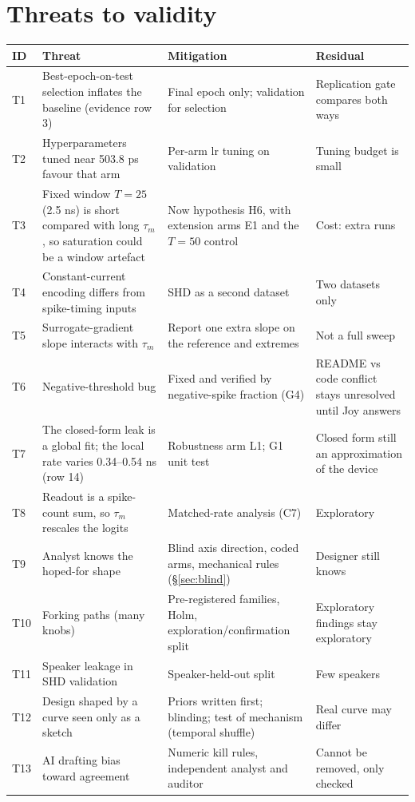 \documentclass[10pt,a4paper]{article}
\newcommand{\taum}{\tau_m}
\begin{document}
\section{Threats to validity}
{\footnotesize
\begin{longtable}{@{}p{0.8cm}L{4.4cm}L{6.0cm}L{3.0cm}@{}}
\toprule ID & Threat & Mitigation & Residual\\ \midrule\endhead
T1 & Best-epoch-on-test selection inflates the baseline (evidence row 3) & Final epoch only; validation for selection & Replication gate compares both ways\\
T2 & Hyperparameters tuned near 503.8 ps favour that arm & Per-arm lr tuning on validation & Tuning budget is small\\
T3 & Fixed window $T=25$ (2.5 ns) is short compared with long $\taum$, so saturation could be a window artefact & Now hypothesis H6, with extension arms E1 and the $T=50$ control & Cost: extra runs\\
T4 & Constant-current encoding differs from spike-timing inputs & SHD as a second dataset & Two datasets only\\
T5 & Surrogate-gradient slope interacts with $\taum$ & Report one extra slope on the reference and extremes & Not a full sweep\\
T6 & Negative-threshold bug & Fixed and verified by negative-spike fraction (G4) & README vs code conflict stays unresolved until Joy answers\\
T7 & The closed-form leak is a global fit; the local rate varies 0.34--0.54 ns (row 14) & Robustness arm L1; G1 unit test & Closed form still an approximation of the device\\
T8 & Readout is a spike-count sum, so $\taum$ rescales the logits & Matched-rate analysis (C7) & Exploratory\\
T9 & Analyst knows the hoped-for shape & Blind axis direction, coded arms, mechanical rules (\S\ref{sec:blind}) & Designer still knows\\
T10 & Forking paths (many knobs) & Pre-registered families, Holm, exploration/confirmation split & Exploratory findings stay exploratory\\
T11 & Speaker leakage in SHD validation & Speaker-held-out split & Few speakers\\
T12 & Design shaped by a curve seen only as a sketch & Priors written first; blinding; test of mechanism (temporal shuffle) & Real curve may differ\\
T13 & AI drafting bias toward agreement & Numeric kill rules, independent analyst and auditor & Cannot be removed, only checked\\

\end{longtable}}
\end{document}
